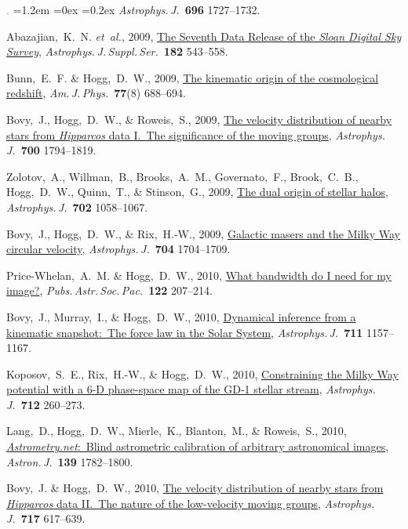 \documentclass[10pt,letterpaper]{article}
\newcommand{\acronym}[1]{{\small{#1}}}
\newcommand{\foreign}[1]{\textsl{#1}}
\newcommand{\etal}{\foreign{et~al.}}
\newcommand{\project}[1]{\textsl{#1}}
\newcommand{\doi}[2]{\href{http://dx.doi.org/#1}{{#2}}}
\newcommand{\deemph}[1]{\textcolor{grey}{\footnotesize{#1}}}
\newcommand{\pubnumber}[1]{\deemph{{#1}.}}
\newcounter{refpubnum}
\newcommand{\hogglist}{%
    \rightmargin=0in
    \leftmargin=1.2em
    \topsep=0ex
    \partopsep=0pt
    \itemsep=0.2ex
    \parsep=0pt
    \itemindent=-1.0\leftmargin
    \listparindent=0.0\leftmargin
    \settowidth{\labelsep}{~}
    \usecounter{refpubnum}
  }
\begin{document}
\begin{list}{\pubnumber{\therefpubnum}}{\hogglist}
\textit{Astrophys.\,J.}\ \textbf{696} 1727--1732.
\item
Abazajian,~K.~N. \etal, 2009,
\doi{10.1088/0067-0049/182/2/543}{The Seventh Data Release of the \project{Sloan Digital Sky Survey}},
\textit{Astrophys.\,J.\,Suppl.\,Ser.}\ \textbf{182} 543--558.
\item
Bunn,~E.~F. \& Hogg,~D.~W., 2009,
\doi{10.1119/1.3129103}{The kinematic origin of the cosmological redshift},
\textit{Am.\,J.\,Phys.}\ \textbf{77}(8) 688--694.
\item
Bovy,~J., Hogg,~D.~W., \& Roweis,~S., 2009,
\doi{10.1088/0004-637X/700/2/1794}{The velocity distribution of nearby stars from \project{Hipparcos} data I.~The significance of the moving groups},
\textit{Astrophys.\,J.}\ \textbf{700} 1794--1819.
\item
Zolotov,~A., Willman,~B., Brooks,~A.~M., Governato,~F., Brook,~C.~B., Hogg,~D.~W., Quinn,~T., \& Stinson,~G., 2009,
\doi{10.1088/0004-637X/702/2/1058}{The dual origin of stellar halos},
\textit{Astrophys.\,J.}\ \textbf{702} 1058--1067.
\item
Bovy,~J., Hogg,~D.~W., \& Rix,~H.-W., 2009,
\doi{10.1088/0004-637X/704/2/1704}{Galactic masers and the Milky Way circular velocity},
\textit{Astrophys.\,J.}\ \textbf{704} 1704--1709.
\item
Price-Whelan,~A.~M. \& Hogg,~D.~W., 2010,
\doi{10.1086/651009}{What bandwidth do I need for my image?},
\textit{Pubs.\,Astr.\,Soc.\,Pac.}\ \textbf{122} 207--214.
\item
Bovy,~J., Murray,~I., \& Hogg,~D.~W., 2010,
\doi{10.1088/0004-637X/711/2/1157}{Dynamical inference from a kinematic snapshot:\ The force law in the Solar System},
\textit{Astrophys.\,J.}\ \textbf{711} 1157--1167.
\item
Koposov,~S.~E., Rix,~H.-W., \& Hogg,~D.~W., 2010,
\doi{10.1088/0004-637X/712/1/260}{Constraining the Milky Way potential with a 6-D phase-space map of the GD-1 stellar stream},
\textit{Astrophys.\,J.}\ \textbf{712} 260--273.
\item
Lang,~D., Hogg,~D.~W., Mierle,~K., Blanton,~M., \& Roweis,~S., 2010,
\doi{10.1088/0004-6256/139/5/1782}{\project{Astrometry.net}:\ Blind astrometric calibration of arbitrary astronomical images},
\textit{Astron.\,J.}\ \textbf{139} 1782--1800.
\item
Bovy,~J. \& Hogg,~D.~W., 2010,
\doi{10.1088/0004-637X/717/2/617}{The velocity distribution of nearby stars from \project{Hipparcos} data \acronym{II}.\ The nature of the low-velocity moving groups},
\textit{Astrophys.\,J.}\ \textbf{717} 617--639.

\end{list}
\end{document}
